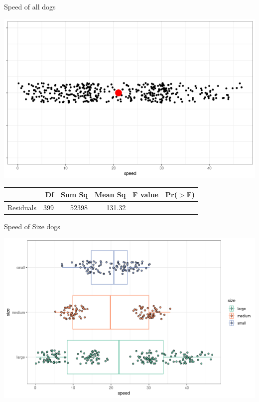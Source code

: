 \documentclass{beamer}
\begin{document}
\begin{frame}{Speed of all dogs}
\small
\begin{center}
\includegraphics[scale=0.45]{all_dog_speed_mean.png}
\end{center}
\begin{table}[ht]
\centering
\begin{tabular}{lrrrrr}
  \hline
 & Df & Sum Sq & Mean Sq & F value & Pr($>$F) \\ 
  \hline
Residuals   & 399 & 52398 & 131.32 &  &  \\ 
   \hline
\end{tabular}
\end{table}
\end{frame}



\begin{frame}{Speed of Size dogs}
\begin{center}
\includegraphics[scale=0.45]{size_dog_speed.png}
\end{center}
\end{frame}
\end{document}
